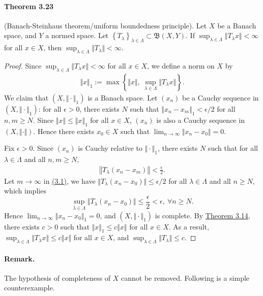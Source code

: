 \documentclass{article}
\begin{document}
\paragraph{Theorem 3.23\label{thm:3.23}} (Banach-Steinhaus theorem/uniform boundedness principle). Let $X$ be a Banach space, and  $Y$ a normed space. Let $\left\{T_\lambda\right\}_{\lambda\in\Lambda}\subset\mathfrak{B}(X,Y)$. If $\sup_{\lambda\in\Lambda}\Vert T_\lambda x\Vert < \infty$ for all $x\in X$, then $\sup_{\lambda\in\Lambda}\Vert T_\lambda\Vert < \infty$.
\begin{proof}
Since $\sup_{\lambda\in\Lambda}\Vert T_\lambda x\Vert < \infty$ for all $x\in X$, we define a norm on $X$ by
\begin{align*}
	\Vert x\Vert_1 := \max\left\{\Vert x\Vert,\ \sup_{\lambda\in\Lambda}\Vert T_\lambda x\Vert\right\}.
\end{align*}
We claim that $(X,\Vert\cdot\Vert_1)$ is a Banach space. Let $(x_n)$ be a Cauchy sequence in $(X,\Vert\cdot\Vert_1)$: for all $\epsilon>0$, there exists $N$ such that $\Vert x_n-x_m\Vert_1<\epsilon/2$ for all $n,m\geq N$. Since $\Vert x\Vert \leq\Vert x\Vert_1$ for all $x\in X$, $(x_n)$ is also a Cauchy sequence in $(X,\Vert\cdot\Vert)$. Hence there exists $x_0\in X$ such that $\lim_{n\to\infty}\Vert x_n-x_0\Vert=0$.

Fix $\epsilon>0$. Since $(x_n)$ is Cauchy relative to $\Vert\cdot\Vert_1$, there exists $N$ such that for all $\lambda\in\Lambda$ and all $n,m\geq N$,
\begin{align*}
	\left\Vert T_\lambda(x_n-x_m)\right\Vert<\frac{\epsilon}{2}.\tag{3.1}\label{eq:3.1}
\end{align*}
Let $m\to\infty$ in \hyperref[eq:3.1]{(3.1)}, we have $\Vert T_\lambda(x_n-x_0)\Vert\leq\epsilon/2$ for all $\lambda\in\Lambda$ and all $n\geq N$, which implies $$\sup_{\lambda\in\Lambda}\Vert T_\lambda(x_n-x_0)\Vert\leq\frac{\epsilon}{2} < \epsilon,\ \forall n\geq N.$$ 
Hence $\lim_{n\to\infty}\Vert x_n-x_0\Vert_1=0$, and $(X,\Vert\cdot\Vert_1)$ is complete. By \hyperref[thm:3.14]{Theorem 3.14}, there exists $c>0$ such that $\Vert x\Vert_1\leq c\Vert x\Vert$ for all $x\in X$. As a result, $\sup_{\lambda\in\Lambda}\Vert T_\lambda x\Vert\leq c\Vert x\Vert$ for all $x\in X$, and $\sup_{\lambda\in\Lambda}\Vert T_\lambda\Vert\leq c$.
\end{proof}
\paragraph{Remark.} The hypothesis of completeness of $X$ cannot be removed. Following is a simple counterexample.
\end{document}
